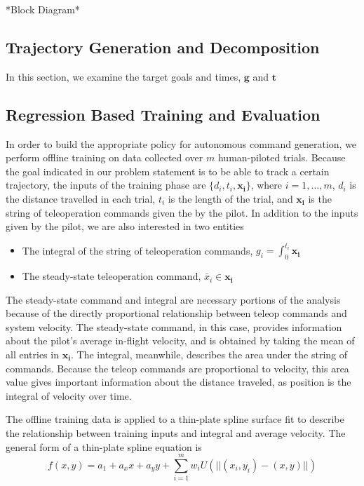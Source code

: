 \documentclass[letterpaper, 10 pt, conference]{ieeeconf}  %
\begin{document}
    *Block Diagram*

\subsection{Trajectory Generation and Decomposition}
In this section, we examine the target goals and times, $\mathbf{g}$ and $\mathbf{t}$


\subsection{Regression Based Training and Evaluation}
In order to build the appropriate policy for autonomous command generation, we perform offline training on data collected over $m$ human-piloted trials. Because the goal indicated in our problem statement is to be able to track a certain trajectory, the inputs of the training phase are $\{d_i,t_i,\mathbf{x_i}\}$, where $i=1,\ldots,m$, $d_i$ is the distance travelled in each trial, $t_i$ is the length of the trial, and $\mathbf{x_i}$ is the string of teleoperation commands given the by the pilot. In addition to the inputs given by the pilot, we are also interested in two entities \begin{itemize}
    \item The integral of the string of teleoperation commands, $g_i = \int_0^{t_i}\mathbf{x_i}$
    \item The steady-state teleoperation command, $\bar{x}_i \in \mathbf{x_i}$
\end{itemize}
The steady-state command and integral are necessary portions of the analysis because of the directly proportional relationship between teleop commands and system velocity. The steady-state command, in this case, provides information about the pilot's average in-flight velocity, and is obtained by taking the mean of all entries in $\mathbf{x_i}$. The integral, meanwhile, describes the area under the string of commands. Because the teleop commands are proportional to velocity, this area value gives important information about the distance traveled, as position is the integral of velocity over time.

The offline training data is applied to a thin-plate spline surface fit to describe the relationship between training inputs and integral and average velocity. The general form of a thin-plate spline equation is 
\begin{equation}
    f(x,y) = a_1 + a_xx + a_yy + \sum_{i=1}^mw_iU(||(x_i,y_i)-(x,y)||)
\end{equation}
\end{document}
